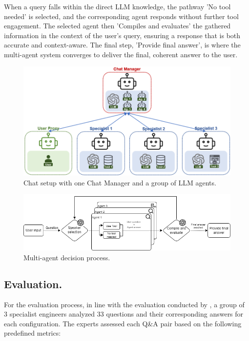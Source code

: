             
            When a query falls within the direct LLM knowledge, the pathway 'No tool needed' is selected, and the corresponding agent responds without further tool engagement.
            The selected agent then 'Compiles and evaluates' the gathered information in the context of the user's query, ensuring a response that is both accurate and context-aware. The final step, 'Provide final answer', is where the multi-agent system converges to deliver the final, coherent answer to the user.
                
            \begin{figure}[h]
                \centering
                \includegraphics[width=.75\textwidth]{images/agent_config_2.png}
                \caption{Chat setup with one Chat Manager and a group of LLM agents.}
                \label{fig:agent_config_2}
            \end{figure}
            
            
            \begin{figure}[h]
                \centering
                \includegraphics[width=1\textwidth]{images/agent_diagram_2.png}
                \caption{Multi-agent decision process.}
                \label{fig:diagrama_agente_MultiAgente_2}
            \end{figure}

            
        \subsection{Evaluation.}             

            For the evaluation process, in line with the evaluation conducted by \cite{Li2023}, a group of 3 specialist engineers analyzed 33 questions and their corresponding answers for each configuration. The experts assessed each Q\&A pair based on the following predefined metrics:

